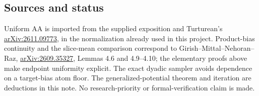 \subsection{Sources and status}\label{influence-recovery:sources-and-status}

Uniform AA is imported from the supplied exposition and Turturean's
\href{https://arxiv.org/abs/2611.09773}{arXiv:2611.09773}, in the
normalization already used in this project. Product-bias continuity and
the slice-mean comparison correspond to Girish--Mittal--Nehoran--Raz,
\href{https://arxiv.org/abs/2609.35327}{arXiv:2609.35327}, Lemmas 4.6
and 4.9--4.10; the elementary proofs above make endpoint uniformity
explicit. The exact dyadic sampler avoids dependence on a target-bias
atom floor. The generalized-potential theorem and iteration are
deductions in this note. No research-priority or formal-verification
claim is made.
